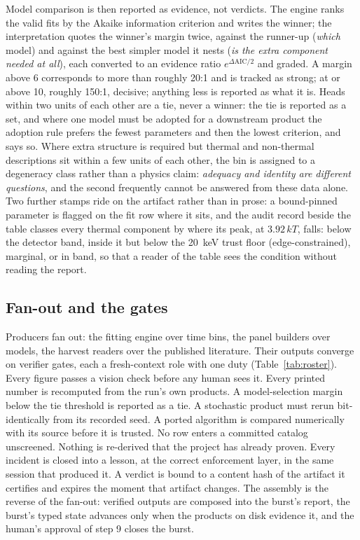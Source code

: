 Model comparison is then reported as evidence, not verdicts. The engine
ranks the valid fits by the Akaike information criterion and writes the
winner; the interpretation quotes the winner's margin twice, against the
runner-up (\emph{which} model) and against the best simpler model it nests
(\emph{is the extra component needed at all}), each converted to an
evidence ratio $e^{\Delta\mathrm{AIC}/2}$ and graded. A margin above 6
corresponds to more than roughly 20:1 and is tracked as strong; at or
above 10, roughly 150:1, decisive; anything less is reported as what it
is. Heads within two units
of each other are a tie, never a winner: the tie is reported as a set, and
where one model must be adopted for a downstream product the adoption rule
prefers the fewest parameters and then the lowest criterion, and says so.
Where extra structure is required but thermal and non-thermal descriptions
sit within a few units of each other, the bin is assigned to a degeneracy
class rather than a physics claim: \emph{adequacy and identity are
different questions}, and the second frequently cannot be answered from
these data alone. Two further stamps ride on the artifact rather than in prose: a
bound-pinned parameter is flagged on the fit row where it sits, and the
audit record beside the table classes every thermal component by where
its peak, at $3.92\,kT$, falls: below the detector band, inside it but
below the 20~keV trust floor (edge-constrained), marginal, or in band, so
that a reader of the table sees the condition without reading the report.

\subsection{Fan-out and the gates} \label{sec:fanout}

Producers fan out: the fitting engine over time bins, the panel builders
over models, the harvest readers over the published literature. Their
outputs converge on verifier gates, each a fresh-context role with one
duty (Table~\ref{tab:roster}). Every figure passes a vision check before
any human sees it. Every printed number is recomputed from the run's own
products. A model-selection margin below the tie threshold is reported as
a tie. A stochastic product must rerun bit-identically from its recorded
seed. A ported algorithm is compared numerically with its source before it
is trusted. No row enters a committed catalog unscreened. Nothing is
re-derived that the project has already proven. Every incident is closed
into a lesson, at the correct enforcement layer, in the same session that
produced it. A verdict is bound to a content hash of the artifact it
certifies and expires the moment that artifact changes. The assembly is the
reverse of the fan-out: verified outputs are composed into the burst's
report, the burst's typed state advances only when the products on disk
evidence it, and the human's approval of step 9 closes the burst.

